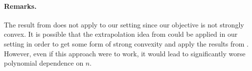 \documentclass[format=acmsmall,authorversion]{acmart}
\newcommand{\BRC}[1]{{\textcolor{red}{BRC: #1}}}
\newcommand{\notename}[2]{{\textcolor{blue}{\footnotesize{\bf (#1:} {#2}{\bf ) }}}}
\newcommand{\RM}[1]{{\notename{RM}{#1}}}
\begin{document}

\paragraph{Remarks. } 
The result from \citet{journee2010generalized} does not apply to our setting since our objective is not strongly convex. It is possible that the extrapolation idea from \citet{gao2020first} could be applied in our setting in order to get some form of strong convexity and apply the results from \citet{journee2010generalized}. However, even if this approach were to work, it would lead to significantly worse polynomial dependence on $n$.
\end{document}
